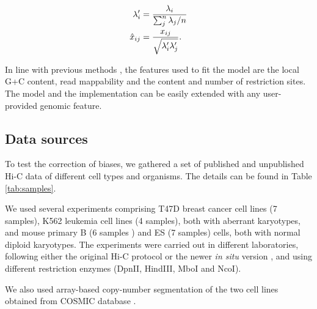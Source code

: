 \documentclass{bioinfo}
\begin{document}
\begin{methods}
\begin{align}
\notag
\lambda_i' &= \frac{\lambda_i}{\sum_j^n{\lambda_j}/n} \\
\label{eq:xhat}
\hat{x}_{ij} &= \frac{x_{ij}}{\sqrt{\lambda_i'\lambda_j'}}.
\end{align}

In line with previous methods
\citep{yaffe2011probabilistic,hu2012hicnorm}, the features
used to fit the model are the local G+C content, read mappability and the 
content and number of restriction sites. The model and the implementation
can be easily extended with any user-provided genomic feature.

\subsection{Data sources}

To test the correction of biases, we gathered a set of
published \citep{ledily2014distinct, encode2012integrated, rao20143d,
stadhouders2017transcription, lin2012global, dixon2012topological} and
unpublished Hi-C data of different cell types and organisms. The details
can be found in Table \ref{tab:samples}.

We used several experiments comprising T47D breast cancer cell
lines (7 samples), K562 leukemia cell lines (4 samples), both with
aberrant karyotypes, and mouse primary B (6 samples ) and ES (7 samples)
cells, both with normal diploid karyotypes. The experiments were carried
out in different laboratories, following either the original Hi-C protocol
\citep{lieberman2009comprehensive} or the newer \textit{in situ} version
\citep{rao20143d}, and using different restriction enzymes (DpnII,
HindIII, MboI and NcoI).

We also used array-based copy-number segmentation of the two cell
lines obtained from COSMIC database \citep{forbes2010cosmic}.
 

\end{methods}
\end{document}
